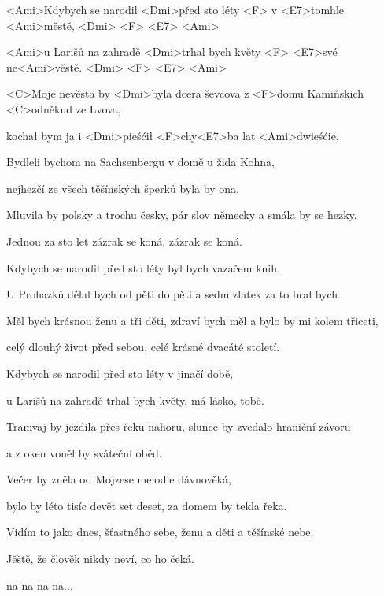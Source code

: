 

\zs
<Ami>Kdybych se narodil <Dmi>před sto léty
<F> v <E7>tomhle <Ami>městě, <Dmi> <F> <E7> <Ami>

<Ami>u Larišů na zahradě <Dmi>trhal bych květy <F>
<E7>své ne<Ami>věstě. <Dmi> <F> <E7> <Ami>

<C>Moje nevěsta by <Dmi>byla dcera ševcova
z <F>domu Kamińskich <C>odněkud ze Lvova,

kochał bym ja i <Dmi>pieśćił <F>chy<E7>ba lat <Ami>dwieśćie.
\ks

\zs
Bydleli bychom na Sachsenbergu v domě u žida Kohna,

nejhezčí ze všech těšínských šperků byla by ona.

Mluvila by polsky a trochu česky,
pár slov německy a smála by se hezky.

Jednou za sto let zázrak se koná, zázrak se koná.
\ks

\zs
Kdybych se narodil před sto léty byl bych vazačem knih.

U Prohazků dělal bych od pěti do pěti a sedm zlatek za to bral bych.

Měl bych krásnou ženu a tři děti,
zdraví bych měl a bylo by mi kolem třiceti,

celý dlouhý život před sebou, celé krásné dvacáté století.
\ks

\zs
Kdybych se narodil před sto léty v jinačí době,

u Larišů na zahradě trhal bych květy, má lásko, tobě.

Tramvaj by jezdila přes řeku nahoru,
slunce by zvedalo hraniční závoru

a z oken voněl by sváteční oběd.
\ks

\zs
Večer by zněla od Mojzese melodie dávnověká,

bylo by léto tisíc devět set deset, za domem by tekla řeka.

Vidím to jako dnes, šťastného sebe,
ženu a děti a těšínské nebe.

Jěště, že člověk nikdy neví, co ho čeká.

na na na na...
\ks

\kp





